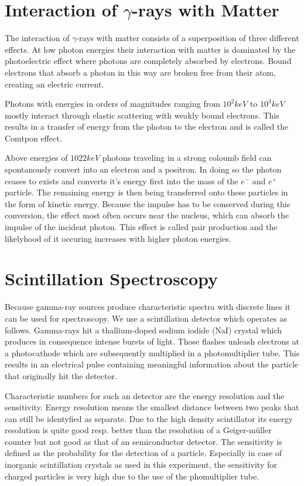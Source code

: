 \documentclass[bigchapter,colorback,accentcolor=tud4b,linedtoc,11pt]{tudreport}
\begin{document}
\section{Interaction of $\gamma$-rays with Matter}
The interaction of $\gamma$-rays with matter consists of a superposition
of three different effects. At low photon energies their interaction with matter
is dominated by the photoelectric effect where photons are completely absorbed
by electrons. Bound electrons that absorb a photon in this way are broken free
from their atom, creating an electric current.

Photons with energies in orders of magnitudes ranging from $10^2 keV$ to $10^3 keV$
mostly interact through elastic scattering with weakly bound electrons. This
results in a transfer of energy from the photon to the electron and is called
the Comtpon effect.

Above energies of $1022keV$ photons traveling in a strong coloumb field can
spontanously convert into an electron and a positron. In doing so the photon
ceases to exists and converts it's energy first into the mass of the $e^-$ and
$e^+$ particle. The remaining energy is then being transferred onto these
particles in the form of kinetic energy. Because the impulse has to be conserved
during this conversion, the effect most often occurs near the nucleus, which can
absorb the impulse of the incident photon. This effect is called pair production
and the likelyhood of it occuring increases with higher photon energies.



\section{Scintillation Spectroscopy}

Because gamma-ray sources produce characteristic spectra with discrete lines it can be used for spectroscopy. We use a scintillation detector which operates as follows. Gamma-rays hit a thallium-doped sodium iodide (NaI) crystal which produces in consequence intense bursts of light. Those flashes unleash electrons at a photocathode which are subsequently multiplied in a photomultiplier tube. This results in an electrical pulse containing meaningful information about the particle that originally hit the detector.

Characteristic numbers for such an detector are the energy resolution and the sensitivity. Energy resolution means the smallest distance between two peaks that can still be identyfied as separate. Due to the high density scintillator its energy resolution is quite good resp. better than the resolution of a Geiger-müller counter but not good as that of an semiconductor detector. The sensitivity is defined as the probability for the detection of a particle. Especially in case of inorganic scintillation crystals as used in this experiment, the sensitivity for charged particles is very high due to the use of the phomultiplier tube.
\end{document}
